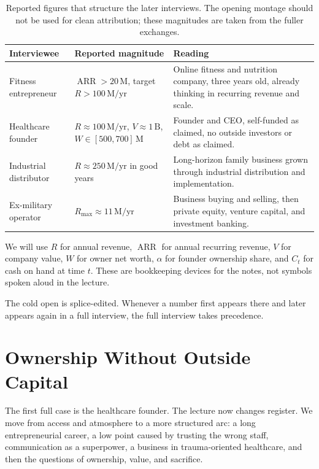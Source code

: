 \begin{table}[h]
\centering
\begin{tabular}{|p{3.0cm}|p{4.4cm}|p{6.0cm}|}
\hline
Interviewee & Reported magnitude & Reading \\
\hline
Fitness entrepreneur & $\operatorname{ARR} > 20\,\mathrm{M}$, target $R>100\,\mathrm{M}/\mathrm{yr}$ & Online fitness and nutrition company, three years old, already thinking in recurring revenue and scale. \\
\hline
Healthcare founder & $R \approx 100\,\mathrm{M}/\mathrm{yr}$, $V \approx 1\,\mathrm{B}$, $W \in [500,700]\,\mathrm{M}$ & Founder and CEO, self-funded as claimed, no outside investors or debt as claimed. \\
\hline
Industrial distributor & $R \approx 250\,\mathrm{M}/\mathrm{yr}$ in good years & Long-horizon family business grown through industrial distribution and implementation. \\
\hline
Ex-military operator & $R_{\max} \approx 11\,\mathrm{M}/\mathrm{yr}$ & Business buying and selling, then private equity, venture capital, and investment banking. \\
\hline
\end{tabular}
\caption{Reported figures that structure the later interviews. The opening montage should not be used for clean attribution; these magnitudes are taken from the fuller exchanges.}
\end{table}

\begin{definition}
We will use $R$ for annual revenue, $\operatorname{ARR}$ for annual recurring revenue, $V$ for company value, $W$ for owner net worth, $\alpha$ for founder ownership share, and $C_t$ for cash on hand at time $t$. These are bookkeeping devices for the notes, not symbols spoken aloud in the lecture.
\end{definition}

\begin{remark}
The cold open is splice-edited. Whenever a number first appears there and later appears again in a full interview, the full interview takes precedence.
\end{remark}

\section{Ownership Without Outside Capital}

The first full case is the healthcare founder. The lecture now changes register. We move from access and atmosphere to a more structured arc: a long entrepreneurial career, a low point caused by trusting the wrong staff, communication as a superpower, a business in trauma-oriented healthcare, and then the questions of ownership, value, and sacrifice.

